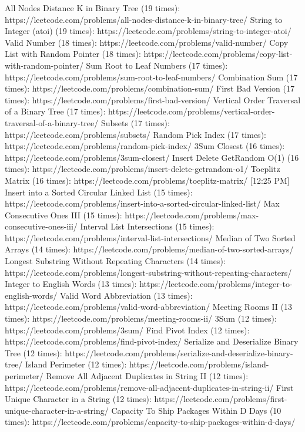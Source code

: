 All Nodes Distance K in Binary Tree (19 times): https://leetcode.com/problems/all-nodes-distance-k-in-binary-tree/
String to Integer (atoi) (19 times): https://leetcode.com/problems/string-to-integer-atoi/
Valid Number (18 times): https://leetcode.com/problems/valid-number/
Copy List with Random Pointer (18 times): https://leetcode.com/problems/copy-list-with-random-pointer/
Sum Root to Leaf Numbers (17 times): https://leetcode.com/problems/sum-root-to-leaf-numbers/
Combination Sum (17 times): https://leetcode.com/problems/combination-sum/
First Bad Version (17 times): https://leetcode.com/problems/first-bad-version/
Vertical Order Traversal of a Binary Tree (17 times): https://leetcode.com/problems/vertical-order-traversal-of-a-binary-tree/
Subsets (17 times): https://leetcode.com/problems/subsets/
Random Pick Index (17 times): https://leetcode.com/problems/random-pick-index/
3Sum Closest (16 times): https://leetcode.com/problems/3sum-closest/
Insert Delete GetRandom O(1) (16 times): https://leetcode.com/problems/insert-delete-getrandom-o1/
Toeplitz Matrix (16 times): https://leetcode.com/problems/toeplitz-matrix/
[12:25 PM]
Insert into a Sorted Circular Linked List (15 times): https://leetcode.com/problems/insert-into-a-sorted-circular-linked-list/
Max Consecutive Ones III (15 times): https://leetcode.com/problems/max-consecutive-ones-iii/
Interval List Intersections (15 times): https://leetcode.com/problems/interval-list-intersections/
Median of Two Sorted Arrays (14 times): https://leetcode.com/problems/median-of-two-sorted-arrays/
Longest Substring Without Repeating Characters (14 times): https://leetcode.com/problems/longest-substring-without-repeating-characters/
Integer to English Words (13 times): https://leetcode.com/problems/integer-to-english-words/
Valid Word Abbreviation (13 times): https://leetcode.com/problems/valid-word-abbreviation/
Meeting Rooms II (13 times): https://leetcode.com/problems/meeting-rooms-ii/
3Sum (12 times): https://leetcode.com/problems/3sum/
Find Pivot Index (12 times): https://leetcode.com/problems/find-pivot-index/
Serialize and Deserialize Binary Tree (12 times): https://leetcode.com/problems/serialize-and-deserialize-binary-tree/
Island Perimeter (12 times): https://leetcode.com/problems/island-perimeter/
Remove All Adjacent Duplicates in String II (12 times): https://leetcode.com/problems/remove-all-adjacent-duplicates-in-string-ii/
First Unique Character in a String (12 times): https://leetcode.com/problems/first-unique-character-in-a-string/
Capacity To Ship Packages Within D Days (10 times): https://leetcode.com/problems/capacity-to-ship-packages-within-d-days/
